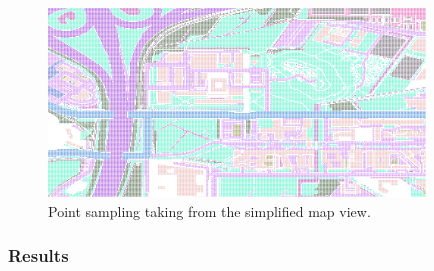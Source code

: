 \documentclass{article}
\begin{document}
\begin{figure}
    \centering
    \includegraphics[width=10cm]{figs/usp_points.png}
    \caption{Point sampling taking from the simplified map view.}
    \label{fig:uithof-points}
\end{figure}

\subsubsection*{Results}



\end{document}
